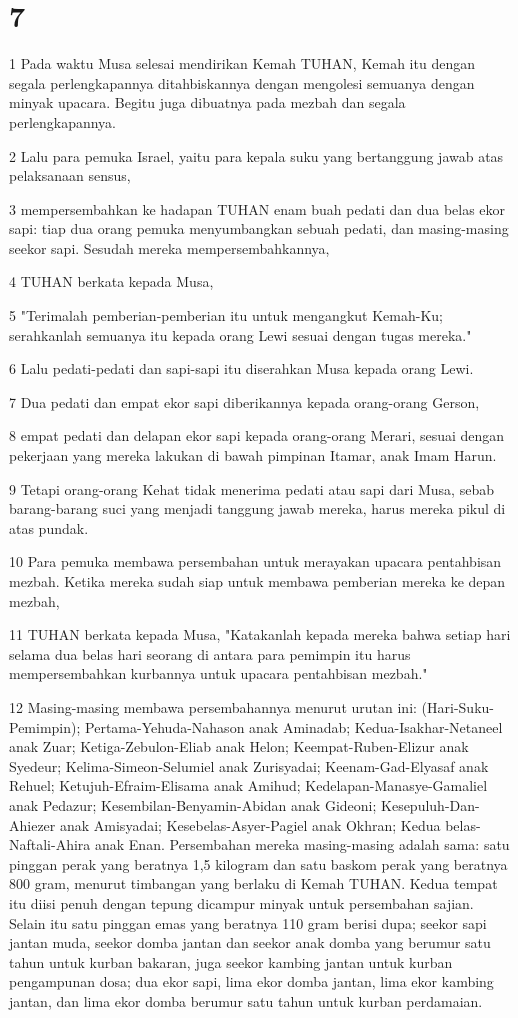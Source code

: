 \chapter{7}

\par 1 Pada waktu Musa selesai mendirikan Kemah TUHAN, Kemah itu dengan segala perlengkapannya ditahbiskannya dengan mengolesi semuanya dengan minyak upacara. Begitu juga dibuatnya pada mezbah dan segala perlengkapannya.
\par 2 Lalu para pemuka Israel, yaitu para kepala suku yang bertanggung jawab atas pelaksanaan sensus,
\par 3 mempersembahkan ke hadapan TUHAN enam buah pedati dan dua belas ekor sapi: tiap dua orang pemuka menyumbangkan sebuah pedati, dan masing-masing seekor sapi. Sesudah mereka mempersembahkannya,
\par 4 TUHAN berkata kepada Musa,
\par 5 "Terimalah pemberian-pemberian itu untuk mengangkut Kemah-Ku; serahkanlah semuanya itu kepada orang Lewi sesuai dengan tugas mereka."
\par 6 Lalu pedati-pedati dan sapi-sapi itu diserahkan Musa kepada orang Lewi.
\par 7 Dua pedati dan empat ekor sapi diberikannya kepada orang-orang Gerson,
\par 8 empat pedati dan delapan ekor sapi kepada orang-orang Merari, sesuai dengan pekerjaan yang mereka lakukan di bawah pimpinan Itamar, anak Imam Harun.
\par 9 Tetapi orang-orang Kehat tidak menerima pedati atau sapi dari Musa, sebab barang-barang suci yang menjadi tanggung jawab mereka, harus mereka pikul di atas pundak.
\par 10 Para pemuka membawa persembahan untuk merayakan upacara pentahbisan mezbah. Ketika mereka sudah siap untuk membawa pemberian mereka ke depan mezbah,
\par 11 TUHAN berkata kepada Musa, "Katakanlah kepada mereka bahwa setiap hari selama dua belas hari seorang di antara para pemimpin itu harus mempersembahkan kurbannya untuk upacara pentahbisan mezbah."
\par 12 Masing-masing membawa persembahannya menurut urutan ini: (Hari-Suku-Pemimpin); Pertama-Yehuda-Nahason anak Aminadab; Kedua-Isakhar-Netaneel anak Zuar; Ketiga-Zebulon-Eliab anak Helon; Keempat-Ruben-Elizur anak Syedeur; Kelima-Simeon-Selumiel anak Zurisyadai; Keenam-Gad-Elyasaf anak Rehuel; Ketujuh-Efraim-Elisama anak Amihud; Kedelapan-Manasye-Gamaliel anak Pedazur; Kesembilan-Benyamin-Abidan anak Gideoni; Kesepuluh-Dan-Ahiezer anak Amisyadai; Kesebelas-Asyer-Pagiel anak Okhran; Kedua belas-Naftali-Ahira anak Enan. Persembahan mereka masing-masing adalah sama: satu pinggan perak yang beratnya 1,5 kilogram dan satu baskom perak yang beratnya 800 gram, menurut timbangan yang berlaku di Kemah TUHAN. Kedua tempat itu diisi penuh dengan tepung dicampur minyak untuk persembahan sajian. Selain itu satu pinggan emas yang beratnya 110 gram berisi dupa; seekor sapi jantan muda, seekor domba jantan dan seekor anak domba yang berumur satu tahun untuk kurban bakaran, juga seekor kambing jantan untuk kurban pengampunan dosa; dua ekor sapi, lima ekor domba jantan, lima ekor kambing jantan, dan lima ekor domba berumur satu tahun untuk kurban perdamaian.
